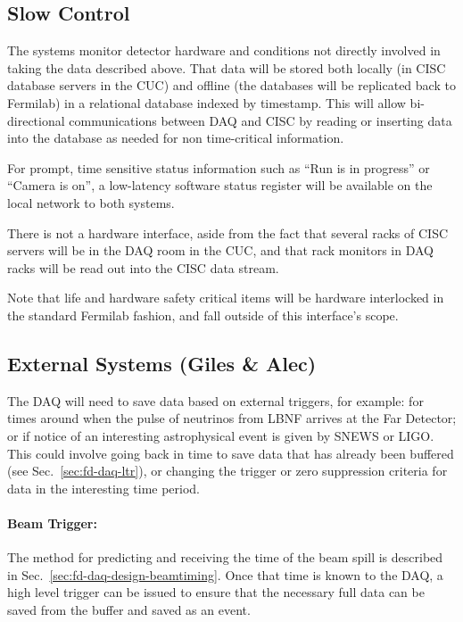 \subsection{Slow Control}
\label{sec:fd-daq-intfc-sc}
\label{sec:fd-daq-intfc-sc}

The  systems monitor detector
hardware and conditions not directly involved in taking the data
described above.  That data will be stored both locally (in CISC
database servers in the CUC) and offline (the databases will be
replicated back to Fermilab) in a relational database indexed by
timestamp.  This will allow bi-directional communications between DAQ
and CISC by reading or inserting data into the database as needed for
non time-critical information.  

For prompt, time sensitive status information such as ``Run is in
progress'' or ``Camera is on'', a low-latency software status register
will be available on the local network to both systems.

There is not a hardware interface, aside from the fact that several
racks of CISC servers will be in the DAQ room in the CUC, and that rack
monitors in DAQ racks will be read out into the CISC data stream.

Note that life and hardware safety critical items will be hardware
interlocked in the standard Fermilab fashion, and fall outside of this
interface's scope.


\subsection{External Systems (Giles \& Alec)}
\label{sec:fd-daq-intfc-ext}


The DAQ will need to save data based on external triggers, for example:
for times around when the pulse of neutrinos from LBNF arrives at the
Far Detector; or if notice of an interesting astrophysical event is
given by SNEWS\cite{snews} or LIGO.  This could involve going back in
time to save data that has already been buffered (see
Sec.~\ref{sec:fd-daq-ltr}), or changing the trigger or zero
suppression criteria for data in the interesting time period.


\paragraph{Beam Trigger:} The method for predicting and receiving the
time of the beam spill is described in
Sec.~\ref{sec:fd-daq-design-beamtiming}.  Once that time is known to
the DAQ, a high level trigger can be issued to ensure that the necessary
full data can be saved from the buffer and saved as an event.

